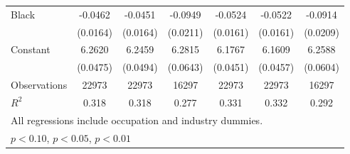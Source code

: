 {\begin{longtable}{l*{6}{c}}
Black               &     -0.0462\sym{***}&     -0.0451\sym{***}&     -0.0949\sym{***}&     -0.0524\sym{***}&     -0.0522\sym{***}&     -0.0914\sym{***}\\
                    &    (0.0164)         &    (0.0164)         &    (0.0211)         &    (0.0161)         &    (0.0161)         &    (0.0209)         \\
Constant            &      6.2620\sym{***}&      6.2459\sym{***}&      6.2815\sym{***}&      6.1767\sym{***}&      6.1609\sym{***}&      6.2588\sym{***}\\
                    &    (0.0475)         &    (0.0494)         &    (0.0643)         &    (0.0451)         &    (0.0457)         &    (0.0604)         \\
\hline  
Observations        &       22973         &       22973         &       16297         &       22973         &       22973         &       16297         \\
\(R^{2}\)           &       0.318         &       0.318         &       0.277         &       0.331         &       0.332         &       0.292         \\
\hline  
\multicolumn{7}{l}{\footnotesize All regressions include occupation and industry dummies.}\\
\multicolumn{7}{l}{\footnotesize \sym{*} \(p<0.10\), \sym{**} \(p<0.05\), \sym{***} \(p<0.01\)}\\
\end{longtable}
}
